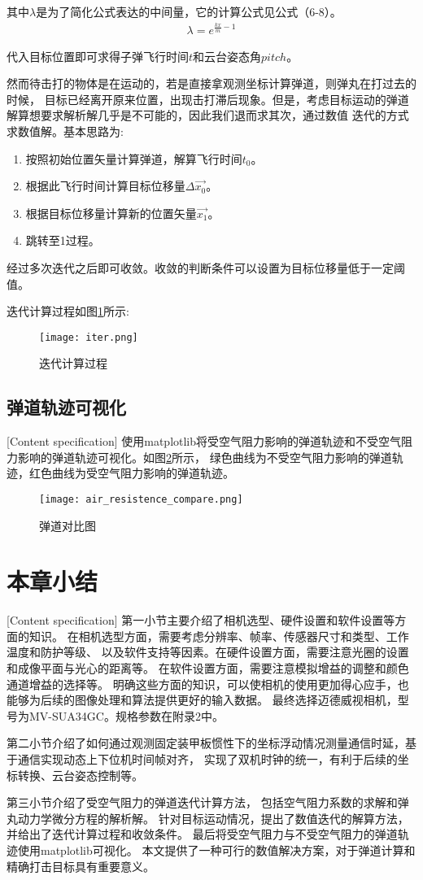 其中$\lambda$是为了简化公式表达的中间量，它的计算公式见公式（6-8）。
\begin{gather}
    \lambda = e^{\frac{kx}{m}-1}
\end{gather}

代入目标位置即可求得子弹飞行时间$t$和云台姿态角$pitch$。\par
然而待击打的物体是在运动的，若是直接拿观测坐标计算弹道，则弹丸在打过去的时候，
目标已经离开原来位置，出现击打滞后现象。但是，考虑目标运动的弹道解算想要求解析解几乎是不可能的，因此我们退而求其次，通过数值
迭代的方式求数值解。基本思路为:
\begin{enumerate}
    \item 按照初始位置矢量计算弹道，解算飞行时间$t_0$。
    \item 根据此飞行时间计算目标位移量$\Delta \vec{x_0}$。
    \item 根据目标位移量计算新的位置矢量$\vec{x_1}$。
    \item 跳转至1过程。
\end{enumerate}

经过多次迭代之后即可收敛。收敛的判断条件可以设置为目标位移量低于一定阈值。

迭代计算过程如图\ref{迭代计算过程}所示:

\begin{figure}[H]
    \centering
    \texttt{[image: iter.png]} 
    \caption{迭代计算过程} 
    \label{迭代计算过程}
\end{figure}

\subsection{弹道轨迹可视化}[Content specification]
使用matplotlib将受空气阻力影响的弹道轨迹和不受空气阻力影响的弹道轨迹可视化。如图\ref{弹道对比}所示，
绿色曲线为不受空气阻力影响的弹道轨迹，红色曲线为受空气阻力影响的弹道轨迹。
\begin{figure}[H]
    \centering
    \texttt{[image: air\_resistence\_compare.png]} 
    \caption{弹道对比图} 
    \label{弹道对比}
\end{figure}






\section{本章小结}[Content specification]
第一小节主要介绍了相机选型、硬件设置和软件设置等方面的知识。
在相机选型方面，需要考虑分辨率、帧率、传感器尺寸和类型、工作温度和防护等级、
以及软件支持等因素。在硬件设置方面，需要注意光圈的设置和成像平面与光心的距离等。
在软件设置方面，需要注意模拟增益的调整和颜色通道增益的选择等。
明确这些方面的知识，可以使相机的使用更加得心应手，也能够为后续的图像处理和算法提供更好的输入数据。
最终选择迈德威视相机，型号为MV-SUA34GC。规格参数在附录2中。

\par
第二小节介绍了如何通过观测固定装甲板惯性下的坐标浮动情况测量通信时延，基于通信实现动态上下位机时间帧对齐，
实现了双机时钟的统一，有利于后续的坐标转换、云台姿态控制等。

\par
第三小节介绍了受空气阻力的弹道迭代计算方法，
包括空气阻力系数的求解和弹丸动力学微分方程的解析解。
针对目标运动情况，提出了数值迭代的解算方法，并给出了迭代计算过程和收敛条件。
最后将受空气阻力与不受空气阻力的弹道轨迹使用matplotlib可视化。
本文提供了一种可行的数值解决方案，对于弹道计算和精确打击目标具有重要意义。